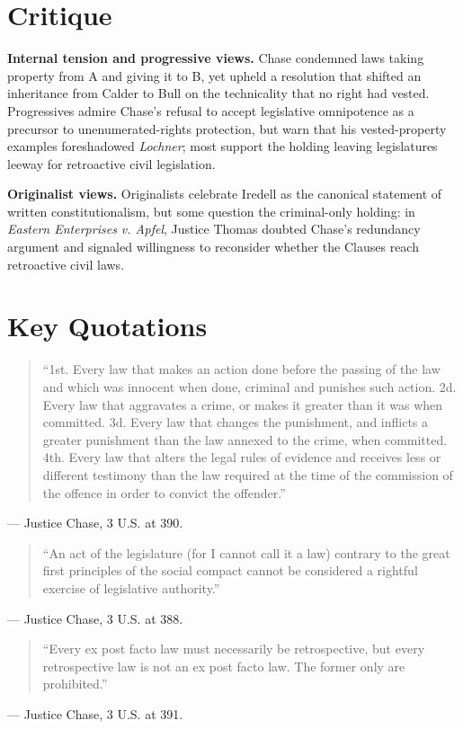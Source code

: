 \documentclass[12pt]{article}
\begin{document}
\section{Critique}

\textbf{Internal tension and progressive views.} Chase condemned laws taking property from A and giving it to B, yet upheld a resolution that shifted an inheritance from Calder to Bull on the technicality that no right had vested. Progressives admire Chase's refusal to accept legislative omnipotence as a precursor to unenumerated-rights protection, but warn that his vested-property examples foreshadowed \textit{Lochner}; most support the holding leaving legislatures leeway for retroactive civil legislation.

\textbf{Originalist views.} Originalists celebrate Iredell as the canonical statement of written constitutionalism, but some question the criminal-only holding: in \textit{Eastern Enterprises v. Apfel}, Justice Thomas doubted Chase's redundancy argument and signaled willingness to reconsider whether the Clauses reach retroactive civil laws.

\section{Key Quotations}

\begin{quote}
``1st. Every law that makes an action done before the passing of the law and which was innocent when done, criminal and punishes such action. 2d. Every law that aggravates a crime, or makes it greater than it was when committed. 3d. Every law that changes the punishment, and inflicts a greater punishment than the law annexed to the crime, when committed. 4th. Every law that alters the legal rules of evidence and receives less or different testimony than the law required at the time of the commission of the offence in order to convict the offender.''
\end{quote}
\noindent --- Justice Chase, 3 U.S. at 390.

\begin{quote}
``An act of the legislature (for I cannot call it a law) contrary to the great first principles of the social compact cannot be considered a rightful exercise of legislative authority.''
\end{quote}
\noindent --- Justice Chase, 3 U.S. at 388.

\begin{quote}
``Every ex post facto law must necessarily be retrospective, but every retrospective law is not an ex post facto law. The former only are prohibited.''
\end{quote}
\noindent --- Justice Chase, 3 U.S. at 391.
\end{document}
